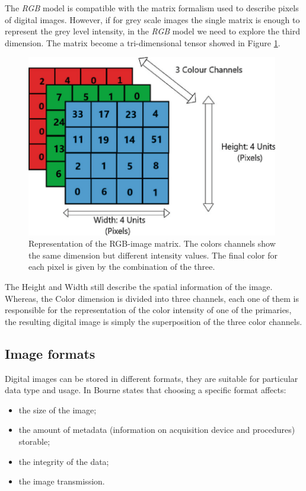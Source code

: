 \documentclass[../main.tex]{subfiles}
\begin{document}
The \textit{RGB} model is compatible with the matrix formalism used to describe pixels of digital images. However, if for grey scale images the single matrix is enough to represent the grey level intensity, in the \textit{RGB} model we need to explore the third dimension. The matrix become a tri-dimensional tensor showed in Figure \ref{fig:rgb}.

\begin{figure}[H] 
\begin{center}
\includegraphics[width=11cm]{images/rgb.png}
\caption{\small{Representation of the RGB-image matrix. The colors channels show the same dimension but different intensity values. The final color for each pixel is given by the combination of the three.}}\label{fig:rgb}
\end{center}
\end{figure}
The Height and Width still describe the spatial information of the image. Whereas, the Color dimension is divided into three channels, each one of them is responsible for the representation of the color intensity of one of the primaries, the resulting digital image is simply the superposition of the three color channels.




\subsection{Image formats}

Digital images can be stored in different formats, they are suitable for particular data type and usage.  In \cite{bourne2010fundamentals} Bourne states that choosing a specific format affects:
\begin{itemize}
    \item the size of the image;
    \item the amount of metadata (information on acquisition device and procedures) storable;
    \item the integrity of the data;
    \item the image transmission.
\end{itemize}
\end{document}
